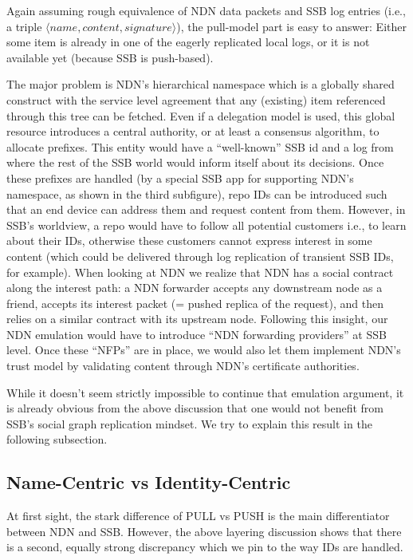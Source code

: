 \documentclass[10pt,sigconf]{acmart}
\begin{document}
Again assuming rough equivalence of NDN data packets and SSB log
entries (i.e., a triple $\langle name,content,signature\rangle$), the
pull-model part is easy to answer: Either some item is already in one
of the eagerly replicated local logs, or it is not available yet
(because SSB is push-based).

The major problem is NDN's hierarchical namespace which is a globally
shared construct with the service level agreement that any (existing)
item referenced through this tree can be fetched.  Even if a
delegation model is used, this global resource introduces a central
authority, or at least a consensus algorithm, to allocate
prefixes. This entity would have a ``well-known'' SSB id and a log
from where the rest of the SSB world would inform itself about its
decisions. Once these prefixes are handled (by a special SSB app for
supporting NDN's namespace, as shown in the third subfigure), repo IDs
can be introduced such that an end device can address them and request
content from them. However, in SSB's worldview, a repo would have to
follow all potential customers i.e., to learn about their IDs,
otherwise these customers cannot express interest in some content
(which could be delivered through log replication of transient SSB
IDs, for example). When looking at NDN we realize that NDN has a
social contract along the interest path: a NDN forwarder accepts any
downstream node as a friend, accepts its interest packet (= pushed
replica of the request), and then relies on a similar contract with
its upstream node. Following this insight, our NDN emulation would
have to introduce ``NDN forwarding providers'' at SSB level. Once
these ``NFPs'' are in place, we would also let them implement
NDN's trust model by validating content through NDN's certificate
authorities.

While it doesn't seem strictly impossible to continue that emulation
argument, it is already obvious from the above discussion that one
would not benefit from SSB's social graph replication mindset. We try
to explain this result in the following subsection.


\subsection{Name-Centric vs Identity-Centric}

At first sight, the stark difference of PULL vs PUSH is the main
differentiator between NDN and SSB. However, the above layering
discussion shows that there is a second, equally strong discrepancy
which we pin to the way IDs are handled.
\end{document}
